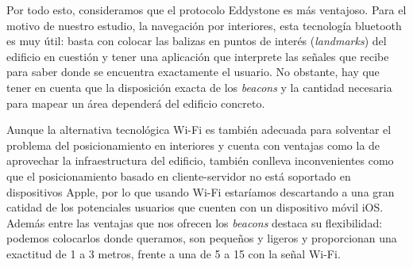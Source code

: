 Por todo esto, consideramos que el protocolo Eddystone es más ventajoso.
Para el motivo de nuestro estudio, la navegación por interiores, esta tecnología bluetooth es muy útil: basta con colocar las balizas en puntos de interés (\textit{landmarks}) del edificio en cuestión y tener una aplicación que interprete las señales que recibe para saber donde se encuentra exactamente el usuario. No obstante, hay que tener en cuenta que la disposición exacta de los \textit{beacons} y la cantidad necesaria para mapear un área dependerá del edificio concreto.

Aunque la alternativa tecnológica Wi-Fi es también adecuada para solventar el problema del posicionamiento en interiores y cuenta con ventajas como la de aprovechar la infraestructura del edificio, también conlleva inconvenientes como que el posicionamiento basado en cliente-servidor no está soportado en dispositivos Apple, por lo que usando Wi-Fi estaríamos descartando a una gran catidad de los potenciales usuarios que cuenten con un dispositivo móvil iOS. Además entre las ventajas que nos ofrecen los \textit{beacons} destaca su flexibilidad: podemos colocarlos donde queramos, son pequeños y ligeros y proporcionan una exactitud de 1 a 3 metros, frente a una de 5 a 15 con la señal Wi-Fi. 





 